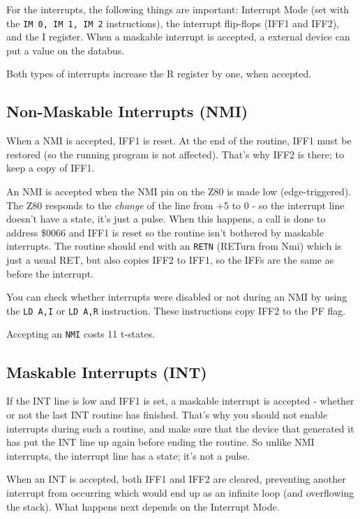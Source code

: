 \documentclass[twoside,openright,a4paper]{book}
\begin{document}
For the interrupts, the following things are important: Interrupt Mode (set with the {\tt IM 0, IM 1, IM 2} instructions), the interrupt flip-flops (IFF1 and IFF2), and the I register. When a maskable interrupt is accepted, a external device can put a value on the databus.

Both types of interrupts increase the R register by one, when accepted.


\subsection{Non-Maskable Interrupts (NMI)}

When a NMI is accepted, IFF1 is reset. At the end of the routine, IFF1 must be restored (so the running program is not affected). That's why IFF2 is there; to keep a copy of IFF1.

An NMI is accepted when the NMI pin on the Z80 is made low (edge-triggered). The Z80 responds to the {\em change} of the line from +5 to 0 - so the interrupt line doesn't have a state, it's just a pulse. When this happens, a call is done to address \$0066 and IFF1 is reset so the routine isn't bothered by maskable interrupts. The routine should end with an {\tt RETN} (RETurn from Nmi) which is just a usual RET, but also copies IFF2 to IFF1, so the IFFs are the same as before the interrupt.

You can check whether interrupts were disabled or not during an NMI by using the {\tt LD A,I} or {\tt LD A,R} instruction. These instructions copy IFF2 to the PF flag.

Accepting an {\tt NMI} costs 11 t-states.


\subsection{Maskable Interrupts (INT)}

If the INT line is low and IFF1 is set, a maskable interrupt is accepted - whether or not the last INT routine has finished. That's why you should not enable interrupts during such a routine, and make sure that the device that generated it has put the INT line up again before ending the routine. So unlike NMI interrupts, the interrupt line has a state; it's not a pulse.

When an INT is accepted, both IFF1 and IFF2 are cleared, preventing another interrupt from occurring which would end up as an infinite loop (and overflowing the stack). What happens next depends on the Interrupt Mode.
\end{document}
